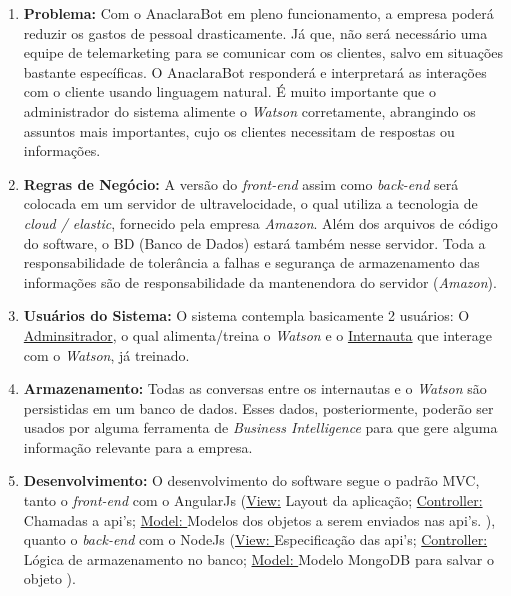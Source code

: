 \begin{enumerate}
\item \textbf{Problema:} Com o AnaclaraBot em pleno funcionamento, a empresa poderá reduzir os gastos de pessoal drasticamente. Já que, não será necessário uma equipe de telemarketing para se comunicar com os clientes, salvo em situações bastante específicas. O AnaclaraBot responderá e interpretará as interações com o cliente usando linguagem natural. É muito importante que o administrador do sistema alimente o \emph{Watson} corretamente, abrangindo os assuntos mais importantes, cujo os clientes necessitam de respostas ou informações.

\item \textbf{Regras de Negócio:} A versão do \emph{front-end} assim como \emph{back-end} será colocada em um servidor de ultravelocidade, o qual utiliza a tecnologia de \emph{cloud / elastic}, fornecido pela empresa \emph{Amazon}. Além dos arquivos de código do software, o BD (Banco de Dados) estará também nesse servidor. Toda a responsabilidade de tolerância a falhas e segurança de armazenamento das informações são de responsabilidade da mantenendora do servidor (\emph{Amazon}).

\item \textbf{Usuários do Sistema:} O sistema contempla basicamente 2 usuários: O \underline{Adminsitrador}, o qual alimenta/treina o \emph{Watson} e o \underline{Internauta} que interage com o \emph{Watson}, já treinado.

\item \textbf{Armazenamento:} Todas as conversas entre os internautas e o \emph{Watson} são persistidas em um banco de dados. Esses dados, posteriormente, poderão ser usados por alguma ferramenta de \emph{Business Intelligence } para que gere alguma informação relevante para a empresa.

\item \textbf{Desenvolvimento:} O desenvolvimento do software segue o padrão MVC, tanto o \textit{front-end} com o AngularJs (\underline{View:} Layout da aplicação;  \underline{Controller:} Chamadas a api's; \underline{Model: } Modelos dos objetos a serem enviados nas api's. ), quanto o \textit{back-end} com o NodeJs (\underline{View: } Especificação das api's; \underline{Controller:} Lógica de armazenamento no banco; \underline{Model: } Modelo MongoDB para salvar o objeto ).
\end{enumerate}
